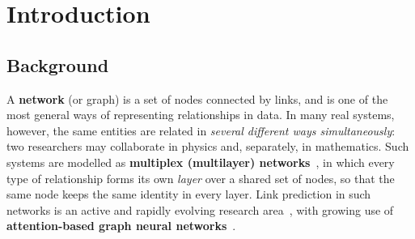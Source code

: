 \documentclass[11pt,a4paper]{article}
\begin{document}
\begin{abstract}
This report documents a 75-hour research internship on link prediction in multiplex networks.
Many real systems -- social platforms, biological interactions, and scientific collaboration --
connect the same entities through several types of relationship at once, and are naturally
modelled as multiplex (multilayer) networks. Predicting which links will form is valuable, yet
the most informative links, the \emph{weak-tie links} that bridge different communities, are also
the hardest: because classical methods rely on shared neighbours, they behave randomly on exactly
these links, and most methods further ignore information shared across layers. During the
internship, the problem and its recent literature were studied -- with particular attention to
attention mechanisms in graph neural networks -- and a set of baseline methods was implemented and
fairly evaluated. Building on this foundation, an attention-based graph neural network was designed,
combining a weak-tie-aware graph-attention encoder, a cross-layer attention mechanism, and a fusion
gate. On a 13-layer arXiv co-authorship network, the model attains the highest ROC-AUC (0.873),
significantly outperforms the graph-neural-network baselines (paired $t$-test, $p<0.001$), and --
unlike classical heuristics -- predicts weak-tie links (ROC-AUC 0.615 versus 0.500 at random),
while remaining interpretable through learned per-layer attention weights.
\end{abstract}

\tableofcontents
\newpage

\section{Introduction}

\subsection{Background}
A \textbf{network} (or graph) is a set of nodes connected by links, and is one of the most general
ways of representing relationships in data. In many real systems, however, the same entities are
related in \emph{several different ways simultaneously}: two researchers may collaborate in physics
and, separately, in mathematics. Such systems are modelled as \textbf{multiplex (multilayer)
networks}~\cite{kivela2014}, in which every type of relationship forms its own \emph{layer} over a
shared set of nodes, so that the same node keeps the same identity in every layer. Link prediction
in such networks is an active and rapidly evolving research area~\cite{survey2025,zangari2024}, with
growing use of \textbf{attention-based graph neural networks}~\cite{gatv2,attnsurvey2023}.
\end{document}
